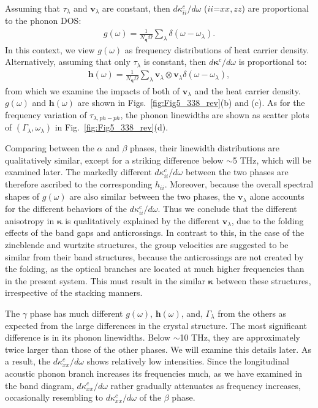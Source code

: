 \documentclass[twocolumn,amsmath,amssymb,a4paper,prb,superscriptaddress,floatfix]{revtex4-1}
\begin{document}
Assuming that $\tau_\lambda$ and $\mathbf{v}_\lambda$ are constant, then
$d\kappa_{ii}^c/d\omega$ ($ii$=$xx,zz$) are proportional to the phonon
DOS: 
\begin{align}
 \label{eq:dos}
 g(\omega) = \frac{1}{N_\mathbf{q}\Omega}
 \sum_\lambda
 \delta(\omega-\omega_{\lambda}).
\end{align}
In this context, we view $g(\omega)$ as frequency distributions of heat
carrier density. Alternatively, assuming that only $\tau_\lambda$ is constant,
then $d\boldsymbol{\kappa}^c/d\omega$ is proportional to:
\begin{align}
 \label{eq:wdos}
 \boldsymbol{h}(\omega) = \frac{1}{N_\mathbf{q}\Omega}
 \sum_\lambda
 \mathbf{v}_\lambda \otimes \mathbf{v}_\lambda
 \delta(\omega-\omega_{\lambda}),
\end{align}
from which we examine the impacts of both of $\mathbf{v}_\lambda$ and the heat carrier
density. $g(\omega)$ and  $\boldsymbol{h}(\omega)$
are shown in
Figs.~\ref{fig:Fig5_338_rev}(b) and (c). As for the frequency
variation of $\tau_{\lambda,ph-ph}$, the phonon linewidths are shown as scatter
plots of $(\Gamma_\lambda,\omega_\lambda)$ in Fig.~\ref{fig:Fig5_338_rev}(d).

Comparing between the $\alpha$ and $\beta$ phases,  their linewidth
distributions are qualitatively similar, except for a striking difference below
$\sim$5 THz, which will be examined later. The markedly different
$d\kappa_{ii}^c/d\omega$ between the two phases are therefore ascribed to the
corresponding $h_{ii}$. Moreover, because the overall spectral shapes of
$g(\omega)$ are also similar between the two phases, the $\mathbf{v}_\lambda$
alone accounts for the different behaviors of the $d\kappa_{ii}^c/d\omega$. Thus
we conclude that the different anisotropy in $\boldsymbol{\kappa}$ is
qualitatively explained by the different $\mathbf{v}_\lambda$, due to the
folding effects of the band gaps and anticrossings. In contrast to this, in the
case of the zincblende and wurtzite structures, the group velocities are
suggested to be similar from their band structures\cite{phono3py}, because the
anticrossings are not created by the folding, as the optical branches are
located at much higher frequencies than in the present system. This
must result in the similar $\boldsymbol{\kappa}$ between these structures,
irrespective of the stacking manners. 

The $\gamma$ phase has much different  $g(\omega)$, $\boldsymbol{h}(\omega)$,
and, $\Gamma_\lambda$ from the others as expected from the large differences in
the crystal structure. The most significant difference is in its phonon
linewidths. Below $\sim$10 THz, they are approximately twice larger than those
of the other phases. We will examine this details later.  As a result, the
$d\kappa_{xx}^c/d\omega$ shows relatively low intensities.  Since the
longitudinal acoustic phonon branch increases its frequencies much, as we have
examined in the band diagram, $d\kappa_{xx}^c/d\omega$ rather gradually
attenuates as frequency increases, occasionally resembling to
$d\kappa_{xx}^c/d\omega$ of the $\beta$ phase.
\end{document}
